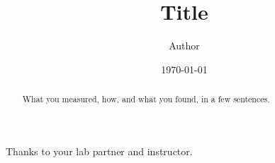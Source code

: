 \documentclass[reprint,aps,pra]{revtex4-2}
\begin{document}
\title{{{Title}}}
\author{{{Author}}}
\date{\today}

\begin{abstract}
What you measured, how, and what you found, in a few sentences.
\end{abstract}

\maketitle







\begin{acknowledgments}
Thanks to your lab partner and instructor.
\end{acknowledgments}

\appendix



\end{document}
